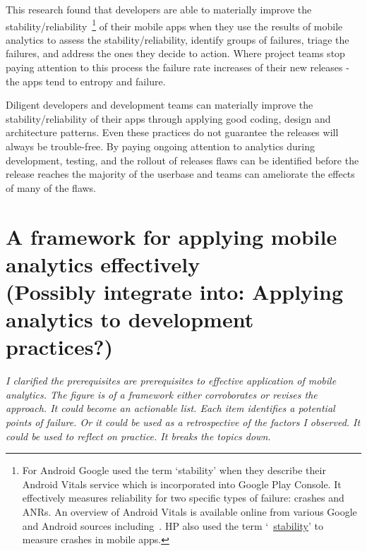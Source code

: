 This research found that developers are able to materially improve the stability/reliability~\footnote{For Android Google used the term `stability' when they describe their Android Vitals service which is incorporated into Google Play Console. It effectively measures reliability for two specific types of failure: crashes and ANRs. An overview of Android Vitals is available online from various Google and Android sources including~\citep{android_vitals_overview_2019, android_vitals_best_practices}. HP also used the term `~\href{glossary-stability}{stability}' to measure crashes in mobile apps.}
%
of their mobile apps when they use the results of mobile analytics to assess the stability/reliability, identify groups of failures, triage the failures, and address the ones they decide to action. Where project teams stop paying attention to this process the failure rate increases of their new releases - the apps tend to entropy and failure.

Diligent developers and development teams can materially improve the stability/reliability of their apps through applying good coding, design and architecture patterns. Even these practices do not guarantee the releases will always be trouble-free. By paying ongoing attention to analytics during development, testing, and the rollout of releases flaws can be identified before the release reaches the majority of the userbase and teams can ameliorate the effects of many of the flaws.
\clearpage 


\section[A framework for applying mobile analytics effectively]{A framework for applying mobile analytics effectively\\ \small{(Possibly integrate into: Applying analytics to development practices?)}}


\textit{I clarified the prerequisites are prerequisites to effective application of mobile analytics. The figure is of a framework either corroborates or revises the approach. It could become an actionable list. Each item identifies a potential points of failure. Or it could be used as a retrospective of the factors I observed. It could be used to reflect on practice. It breaks the topics down.}


